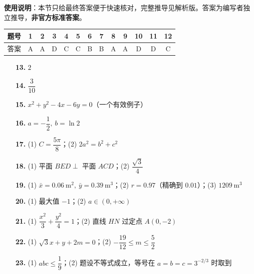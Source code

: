 
\begin{gknotice}
\textbf{使用说明}：本节只给最终答案便于快速核对，完整推导见解析版。答案为编写者独立推导，\textbf{非官方标准答案}。
\end{gknotice}

\begin{center}\begin{tabular}{ccccccccccccc}
\toprule
题号 & 1 & 2 & 3 & 4 & 5 & 6 & 7 & 8 & 9 & 10 & 11 & 12 \\
\midrule
答案 & A & A & D & C & C & B & B & A & A & D & D & C \\
\bottomrule
\end{tabular}\end{center}

\begin{itemize}[leftmargin=2.6em]
  \item[\textbf{13.}] $2$
  \item[\textbf{14.}] $\dfrac3{10}$
  \item[\textbf{15.}] $x^2+y^2-4x-6y=0$（一个有效例子）
  \item[\textbf{16.}] $a=-\dfrac12,\ b=\ln2$
\end{itemize}

\begin{itemize}[leftmargin=2.6em]
  \item[\textbf{17.}] (1) $C=\dfrac{5\pi}{8}$；(2) $2a^2=b^2+c^2$
  \item[\textbf{18.}] (1) 平面 $BED\perp$ 平面 $ACD$；(2) $\dfrac{\sqrt3}{4}$
  \item[\textbf{19.}] (1) $\bar x=0.06\ \mathrm m^2,\ \bar y=0.39\ \mathrm m^3$；(2) $r=0.97$（精确到 $0.01$）；(3) $1209\ \mathrm m^3$
  \item[\textbf{20.}] (1) 最大值 $-1$；(2) $a\in(0,+\infty)$
  \item[\textbf{21.}] (1) $\dfrac{x^2}{3}+\dfrac{y^2}{4}=1$；(2) 直线 $HN$ 过定点 $A(0,-2)$
\end{itemize}

\begin{itemize}[leftmargin=2.6em]
  \item[\textbf{22.}] (1) $\sqrt3x+y+2m=0$；(2) $-\dfrac{19}{12}\le m\le\dfrac52$
  \item[\textbf{23.}] (1) $abc\le\dfrac19$；(2) 题设不等式成立，等号在 $a=b=c=3^{-2/3}$ 时取到
\end{itemize}
